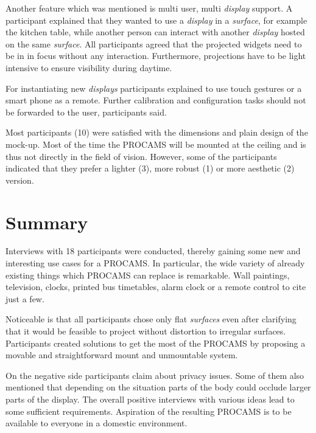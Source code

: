 Another feature which was mentioned is multi user, multi \emph{display} support. A participant explained that they wanted to use a \emph{display} in a \emph{surface}, for example the kitchen table, while another person can interact with another \emph{display} hosted on the same \emph{surface}.
All participants agreed that the projected widgets need to be in in focus without any interaction. Furthermore, projections have to be light intensive to ensure visibility during daytime.  

For instantiating new \emph{displays} participants explained to use touch gestures or a smart phone as a remote. Further calibration and configuration tasks should not be forwarded to the user, participants said. 

Most participants (10) were satisfied with the dimensions and plain design of the mock-up. Most of the time the PROCAMS will be mounted at the ceiling and is thus not directly in the field of vision. However, some of the participants indicated that they prefer a lighter (3), more robust (1) or more aesthetic (2) version.

\section{Summary}
Interviews with 18 participants were conducted, thereby gaining some new and interesting use cases for a \ac{PROCAMS}. In particular, the wide variety of already existing things which \ac{PROCAMS} can replace is remarkable. Wall paintings, television, clocks, printed bus timetables, alarm clock or a remote control to cite just a few.

Noticeable is that all participants chose only flat \emph{surfaces} even after clarifying that it would be feasible to project without distortion to irregular surfaces. Participants created solutions to get the most of the \ac{PROCAMS} by proposing a movable and straightforward  mount and unmountable system.

On the negative side participants claim about privacy issues.  Some of them also mentioned that depending on the situation parts of the body could occlude larger parts of the display. The overall positive interviews with various ideas lead to some sufficient requirements. Aspiration of the resulting \ac{PROCAMS} is to be available to everyone in a domestic environment.